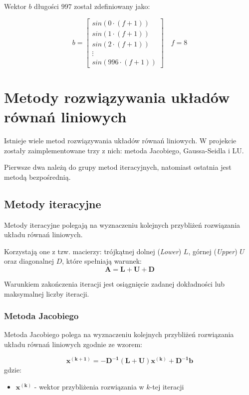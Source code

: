 \documentclass{article}
\begin{document}
Wektor $b$ długości $997$ został zdefiniowany jako:

\begin{equation}
b = \begin{bmatrix}
    sin(0 \cdot (f + 1))\\
    sin(1 \cdot (f + 1))\\
    sin(2 \cdot (f + 1))\\
    \vdots\\
    sin(996 \cdot (f + 1))
\end{bmatrix} \quad f = 8
\end{equation}

\section{Metody rozwiązywania układów równań liniowych}
Istnieje wiele metod rozwiązywania układów równań liniowych. 
W projekcie zostały zaimplementowane trzy z nich: metoda Jacobiego, Gaussa-Seidla i LU.

Pierwsze dwa należą do grupy metod iteracyjnych, 
natomiast ostatnia jest metodą bezpośrednią.

\subsection{Metody iteracyjne}
Metody iteracyjne polegają na wyznaczeniu 
kolejnych przybliżeń rozwiązania układu równań liniowych.

Korzystają one z tzw. macierzy: trójkątnej dolnej (\textit{Lower}) $L$, 
górnej (\textit{Upper}) $U$ oraz diagonalnej $D$,
które spełniają warunek:
\begin{equation}
    \boldsymbol{A = L + U + D}
\end{equation}

Warunkiem zakończenia iteracji jest osiągnięcie
zadanej dokładności lub maksymalnej liczby iteracji.
\subsubsection{Metoda Jacobiego}

Metoda Jacobiego polega na wyznaczeniu kolejnych przybliżeń
rozwiązania układu równań liniowych zgodnie ze wzorem:

\begin{equation}
    \boldsymbol{x^{(k+1)} = -D^{-1}(L + U)x^{(k)} + D^{-1}b}
\end{equation}
gdzie:
\begin{itemize}
    \item $\boldsymbol{x^{(k)}}$ - wektor przybliżenia rozwiązania w $k$-tej iteracji
\end{itemize}
\end{document}
